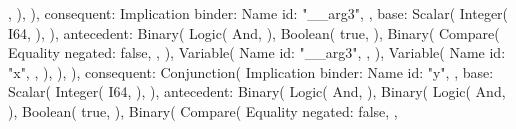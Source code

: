 \documentclass[
  oneside,
  english,
  coorientadorbanca,
  noabntexcite
]{ufsc-thesis-rn46-2019}
\begin{document}
\begin{rustcode}
{{{{                            },
                        ),
                    ),
                    consequent: Implication {
                        binder: Name {
                            id: "__arg3",
                        },
                        base: Scalar(
                            Integer(
                                I64,
                            ),
                        ),
                        antecedent: Binary(
                            Logic(
                                And,
                            ),
                            Boolean(
                                true,
                            ),
                            Binary(
                                Compare(
                                    Equality {
                                        negated: false,
                                    },
                                ),
                                Variable(
                                    Name {
                                        id: "__arg3",
                                    },
                                ),
                                Variable(
                                    Name {
                                        id: "x",
                                    },
                                ),
                            ),
                        ),
                        consequent: Conjunction(
                            Implication {
                                binder: Name {
                                    id: "y",
                                },
                                base: Scalar(
                                    Integer(
                                        I64,
                                    ),
                                ),
                                antecedent: Binary(
                                    Logic(
                                        And,
                                    ),
                                    Binary(
                                        Logic(
                                            And,
                                        ),
                                        Boolean(
                                            true,
                                        ),
                                        Binary(
                                            Compare(
                                                Equality {
                                                    negated: false,
                                                },
}}}}}
\end{rustcode}
\end{document}
